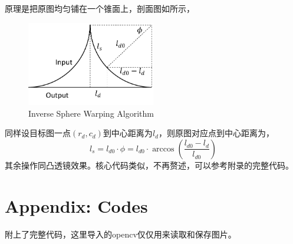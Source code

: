 \documentclass[12pt,a4paper]{article}
\begin{document}
原理是把原图均匀铺在一个锥面上，剖面图如所示，
\begin{figure}[H]
    \centering
    \includegraphics[width=0.5\textwidth]{fig/sphere_inv.pdf}
    \caption{Inverse Sphere Warping Algorithm}
    \label{fig:sphere_inv_alg}
\end{figure}

同样设目标图一点$(r_d, c_d)$到中心距离为$l_d$，则原图对应点到中心距离为，
\begin{equation}
    l_s = l_{d0} \cdot \phi = l_{d0} \cdot \arccos\left(\frac{l_{d0} - l_d}{l_{d0}}\right)
\end{equation}
其余操作同凸透镜效果。核心代码类似，不再赘述，可以参考附录的完整代码。

\section{Appendix: Codes}

附上了完整代码，这里导入的opencv仅仅用来读取和保存图片。

\end{document}
